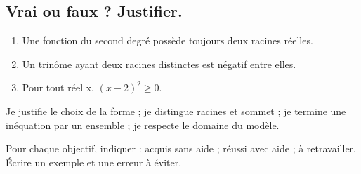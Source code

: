\subsection*{Vrai ou faux ? Justifier.}\label{C02-VF}
\begin{enumerate}
\item Une fonction du second degré possède toujours deux racines réelles.
\item Un trinôme ayant deux racines distinctes est négatif entre elles.
\item Pour tout réel x, $(x-2)^2\geq0$.
\end{enumerate}
\begin{keypoint}Je justifie le choix de la forme ; je distingue racines et sommet ; je termine une inéquation par un ensemble ; je respecte le domaine du modèle.

Pour chaque objectif, indiquer : acquis sans aide ; réussi avec aide ; à retravailler. Écrire un exemple et une erreur à éviter.\end{keypoint}
\endgroup
\ifmxteacher{}\fi
